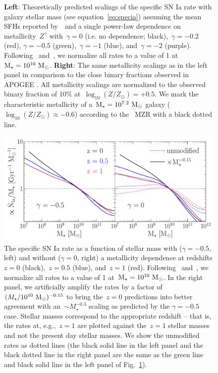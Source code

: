 \documentclass[ms.tex]{subfiles}
\begin{document}
\begin{figure}
\caption{
\textbf{Left}: Theoretically predicted scalings of the specific SN Ia rate with
galaxy stellar mass (see equation~\ref{eq:specia}) assuming the mean SFHs
reported by~\um~and a single power-law dependence on metallicity~$Z^\gamma$
with~$\gamma = 0$ (i.e. no dependence; black),~$\gamma = -0.2$ (red),
$\gamma = -0.5$ (green),~$\gamma = -1$ (blue), and~$\gamma = -2$ (purple).
Following~\citet{Brown2019} and~\citet{Gandhi2022}, we normalize all rates to
a value of 1 at~$\text{M}_\star = 10^{10}~\text{M}_\odot$.
\textbf{Right}: The same metallicity scalings as in the left panel in
comparison to the close binary fractions observed in APOGEE
\citep[][black dashed line with error bars]{Moe2019}.
All metallicity scalings are normalized to the observed binary fraction of 10\%
at~$\log_{10}(Z / Z_\odot) = +0.5$.
We mark the characteristic metallicity of a~$\text{M}_\star = 10^{7.2}~\text{M}_\odot$ galaxy
($\log_{10}(Z / Z_\odot) \approx -0.6$) according to the~\citet{Zahid2014} MZR
with a black dotted line.
}
\label{fig:specia_metdep}
\end{figure}

\begin{figure}
\centering
\includegraphics[scale = 0.56]{umachine_iarate_redshiftevol.pdf}
\caption{
The specific SN Ia rate as a function of stellar mass with ($\gamma = -0.5$,
left) and without ($\gamma = 0$, right) a metallicity dependence at redshifts
$z = 0$ (black),~$z = 0.5$ (blue), and~$z = 1$ (red).
Following~\citet{Brown2019} and~\citet{Gandhi2022}, we normalize all rates to
a value of 1 at~$\text{M}_\star = 10^{10}~\text{M}_\odot$.
In the right panel, we artificially amplify the rates by a factor of
$(M_\star / 10^{10}~\text{M}_\odot)^{-0.15}$ to bring the~$z = 0$ predictions into
better agreement with an~$\sim M_\star^{-0.3}$ scaling as predicted by the
$\gamma = -0.5$ case.
Stellar masses correspond to the appropriate redshift -- that is, the rates at,
e.g.,~$z = 1$ are plotted against the~$z = 1$ stellar masses and not the
present day stellar masses.
We show the unmodified rates as dotted lines (the black solid line in the left
panel and the black dotted line in the right panel are the same as the green
line and black solid line in the left panel of Fig.~\ref{fig:specia_metdep}).
}
\label{fig:specia_zdep}
\end{figure}
\end{document}
